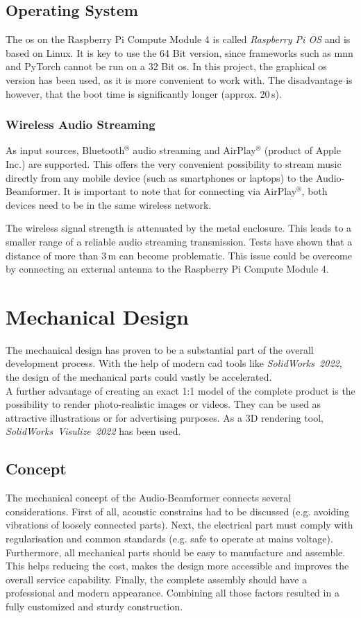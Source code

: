 \subsection{Operating System}
The \acrfull{os} on the Raspberry Pi Compute Module 4 is called \textit{Raspberry Pi OS} and is based on Linux. It is key to use the 64 Bit version, since frameworks such as \acrshort{mnn} and PyTorch cannot be run on a 32 Bit \acrshort{os}. In this project, the graphical \acrshort{os} version has been used, as it is more convenient to work with. The disadvantage is however, that the boot time is significantly longer (approx. 20\,s).

\subsubsection{Wireless Audio Streaming}
As input sources, Bluetooth$^{\circledR}$ audio streaming and AirPlay$^{\circledR}$ (product of Apple Inc.) are supported. This offers the very convenient possibility to stream music directly from any mobile device (such as smartphones or laptops) to the Audio-Beamformer. It is important to note that for connecting via AirPlay$^{\circledR}$, both devices need to be in the same wireless network.

The wireless signal strength is attenuated by the metal enclosure. This leads to a smaller range of a reliable audio streaming transmission. Tests have shown that a distance of more than 3\,m can become problematic. This issue could be overcome by connecting an external antenna to the Raspberry Pi Compute Module 4.

\newpage
\section{Mechanical Design}
The mechanical design has proven to be a substantial part of the overall development process. With the help of modern \acrshort{cad} tools like \mbox{\textit{SolidWorks 2022}}, the design of the mechanical parts could vastly be accelerated.\\
A further advantage of creating an exact 1:1 model of the complete product is the possibility to render photo-realistic images or videos. They can be used as attractive illustrations or for advertising purposes. As a 3D rendering tool, \mbox{\textit{SolidWorks Visulize 2022}} has been used.

\subsection{Concept}
The mechanical concept of the Audio-Beamformer connects several considerations. First of all, acoustic constrains had to be discussed (e.g. avoiding vibrations of loosely connected parts). Next, the electrical part must comply with regularisation and common standards (e.g. safe to operate at mains voltage). Furthermore, all mechanical parts should be easy to manufacture and assemble. This helps reducing the cost, makes the design more accessible and improves the overall service capability. Finally, the complete assembly should have a professional and modern appearance. Combining all those factors resulted in a fully customized  and sturdy construction.

